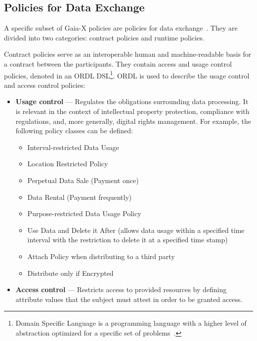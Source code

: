 \subsection{Policies for Data Exchange}\label{subsec:policies-for-data-exchange}

A specific subset of Gaia-X policies are policies for data exchange~\cite{gaiax_data_exchange_document}.
They are divided into two categories: contract policies and runtime policies.

Contract policies serve as an interoperable human and machine-readable basis for a contract between the participants.
They contain access and usage control policies, denoted in an ORDL DSL\footnote{Domain Specific Language is a programming language with a higher level of abstraction optimized for a specific set of problems~\cite{domain_specific_languages}.}.
ORDL is used to describe the usage control and access control policies:

\begin{itemize}
    \item \textbf{Usage control} --- Regulates the obligations surrounding data processing.
    It is relevant in the context of intellectual property protection, compliance with regulations, and, more generally, digital rights management.
    For example, the following policy classes can be defined:
    \begin{itemize}
        \item Interval-restricted Data Usage
        \item Location Restricted Policy
        \item Perpetual Data Sale (Payment once)
        \item Data Rental (Payment frequently)
        \item Purpose-restricted Data Usage Policy
        \item Use Data and Delete it After (allows data usage within a specified time interval with the restriction to delete it at a specified time stamp)
        \item Attach Policy when distributing to a third party
        \item Distribute only if Encrypted
    \end{itemize}
    \item \textbf{Access control} --- Restricts access to provided resources by defining attribute values that the subject must attest in order to be granted access.
\end{itemize}

